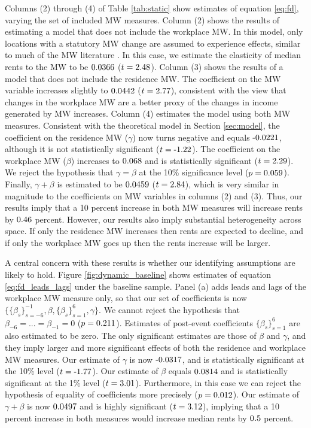Columns (2) through (4) of Table \ref{tab:static} show estimates of equation 
\eqref{eq:fd}, varying the set of included MW measures.
Column (2) shows the results of estimating a model that does not include the 
workplace MW.
In this model, only locations with a statutory MW change are assumed to 
experience effects, similar to much of the MW literature 
\parencite[e.g.,][]{DubeEtAl2010, MeerWest2016, Yamagishi2021}.
In this case, we estimate the elasticity of median rents to the MW to be 
$\textnormal{0.0366}$ ($t=\textnormal{2.48}$).
Column (3) shows the results of a model that does not include the residence MW.
The coefficient on the MW variable increases slightly to 
$\textnormal{0.0442}$ ($t=\textnormal{2.77}$), 
consistent with the view that changes in the workplace MW are a better proxy of 
the changes in income generated by MW increases.
Column (4) estimates the model using both MW measures.
Consistent with the theoretical model in Section \ref{sec:model}, the 
coefficient on the residence MW ($\gamma$) now turns negative and equals 
$\textnormal{-0.0221}$, although it is not statistically significant 
($t=\textnormal{-1.22}$).
The coefficient on the workplace MW ($\beta$) increases to $\textnormal{0.068}$ and 
is statistically significant ($t=\textnormal{2.29}$).
We reject the hypothesis that $\gamma=\beta$ at the 10\% significance level 
($p = \textnormal{0.059}$).
Finally, $\gamma+\beta$ is estimated to be 
$\textnormal{0.0459}$ ($t=\textnormal{2.84}$), which is very similar in magnitude to 
the coefficients on MW variables in columns (2) and (3).
Thus, our results imply that a 10 percent increase in both MW measures will 
increase rents by $\textnormal{0.46}$ percent.
However, our results also imply substantial heterogeneity across space.
If only the residence MW increases then rents are expected to decline,
and if only the workplace MW goes up then the rents increase will be larger.

A central concern with these results is whether our identifying assumptions are 
likely to hold.
Figure \ref{fig:dynamic_baseline} shows estimates of equation 
\eqref{eq:fd_leads_lags} under the baseline sample.
Panel (a) adds leads and lags of the workplace MW measure only, so that
our set of coefficients is now 
$\{\{\beta_s\}_{s=-6}^{-1},\beta,\{\beta_s\}_{s=1}^6,\gamma\}$.
We cannot reject the hypothesis that $\beta_{-6}=...=\beta_{-1}=0$ 
($p = \textnormal{0.211}$).
Estimates of post-event coefficients $\{\beta_s\}_{s=1}^6$ are also estimated to 
be zero.
The only significant estimates are those of $\beta$ and $\gamma$, and they 
imply larger and more significant effects of both the residence and workplace MW
measures.
Our estimate of $\gamma$ is now $\textnormal{-0.0317}$, and is statistically 
significant at the 10\% level ($t=\textnormal{-1.77}$).
Our estimate of $\beta$ equals $\textnormal{0.0814}$ and is statistically 
significant at the 1\% level ($t=\textnormal{3.01}$).
Furthermore, in this case we can reject the hypothesis of equality of 
coefficients more precisely ($p = \textnormal{0.012}$).
Our estimate of $\gamma+\beta$ is now $\textnormal{0.0497}$ and is highly 
significant ($t=\textnormal{3.12}$), implying that a 10 percent increase 
in both measures would increase median rents by $\textnormal{0.5}$ percent.

